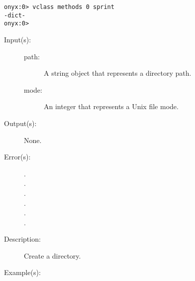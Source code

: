 \begin{description}
\begin{description}
\begin{verbatim}
onyx:0> vclass methods 0 sprint
-dict-
onyx:0>
		\end{verbatim}
	\end{description}
\label{systemdict:mkdir}
\item[{\onyxop{path}{mkdir}{--}}: ]
\item[{\onyxop{path mode}{mkdir}{--}}: ]
	\begin{description}\item[]
	\item[Input(s): ]
		\begin{description}\item[]
		\item[path: ]
			A string object that represents a directory path.
		\item[mode: ]
			An integer that represents a Unix file mode.
		\end{description}
	\item[Output(s): ] None.
	\item[Error(s): ]
		\begin{description}\item[]
		\item[.]
		\item[.]
		\item[.]
		\item[.]
		\item[.]
		\item[.]
		\end{description}
	\item[Description: ]
		Create a directory.
	\item[Example(s): ]\begin{verbatim}


\end{verbatim}
\end{description}
\end{description}
